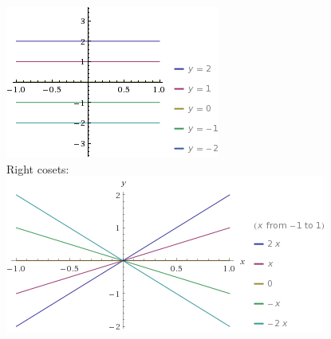 \begin{itemize}
\includegraphics[scale=2.0]{fig/C2_S6_12-1} \\
Right cosets: \\
\includegraphics[scale=1.5]{fig/C2_S6_12-2}
\end{itemize}
%